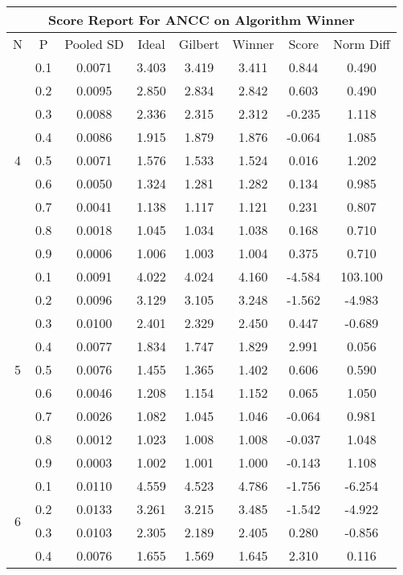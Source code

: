 \documentclass[11pt,a4paper]{report}
\begin{document}
\begin{longtable}{ | c | c || c | c | c | c | c | c | }
\hline
\multicolumn{8}{|c|}{ Score Report For ANCC on Algorithm Winner} \\
\hline
N & P & Pooled SD &  Ideal &  Gilbert & Winner  & Score & Norm Diff \\
 \hline
 \hline
 \endhead
\multirow{9}{*}{4} & 0.1 & 0.0071 & 3.403 & 3.419 & 3.411 & 0.844 & 0.490 \\
 & 0.2 & 0.0095 & 2.850 & 2.834 & 2.842 & 0.603 & 0.490 \\
 & 0.3 & 0.0088 & 2.336 & 2.315 & 2.312 & -0.235 & 1.118 \\
 & 0.4 & 0.0086 & 1.915 & 1.879 & 1.876 & -0.064 & 1.085 \\
 & 0.5 & 0.0071 & 1.576 & 1.533 & 1.524 & 0.016 & 1.202 \\
 & 0.6 & 0.0050 & 1.324 & 1.281 & 1.282 & 0.134 & 0.985 \\
 & 0.7 & 0.0041 & 1.138 & 1.117 & 1.121 & 0.231 & 0.807 \\
 & 0.8 & 0.0018 & 1.045 & 1.034 & 1.038 & 0.168 & 0.710 \\
 & 0.9 & 0.0006 & 1.006 & 1.003 & 1.004 & 0.375 & 0.710 \\
 \hline
\multirow{9}{*}{5} & 0.1 & 0.0091 & 4.022 & 4.024 & 4.160 & -4.584 & 103.100 \\
 & 0.2 & 0.0096 & 3.129 & 3.105 & 3.248 & -1.562 & -4.983 \\
 & 0.3 & 0.0100 & 2.401 & 2.329 & 2.450 & 0.447 & -0.689 \\
 & 0.4 & 0.0077 & 1.834 & 1.747 & 1.829 & 2.991 & 0.056 \\
 & 0.5 & 0.0076 & 1.455 & 1.365 & 1.402 & 0.606 & 0.590 \\
 & 0.6 & 0.0046 & 1.208 & 1.154 & 1.152 & 0.065 & 1.050 \\
 & 0.7 & 0.0026 & 1.082 & 1.045 & 1.046 & -0.064 & 0.981 \\
 & 0.8 & 0.0012 & 1.023 & 1.008 & 1.008 & -0.037 & 1.048 \\
 & 0.9 & 0.0003 & 1.002 & 1.001 & 1.000 & -0.143 & 1.108 \\
 \hline
\multirow{9}{*}{6} & 0.1 & 0.0110 & 4.559 & 4.523 & 4.786 & -1.756 & -6.254 \\
 & 0.2 & 0.0133 & 3.261 & 3.215 & 3.485 & -1.542 & -4.922 \\
 & 0.3 & 0.0103 & 2.305 & 2.189 & 2.405 & 0.280 & -0.856 \\
 & 0.4 & 0.0076 & 1.655 & 1.569 & 1.645 & 2.310 & 0.116 \\

\end{longtable}
\end{document}
